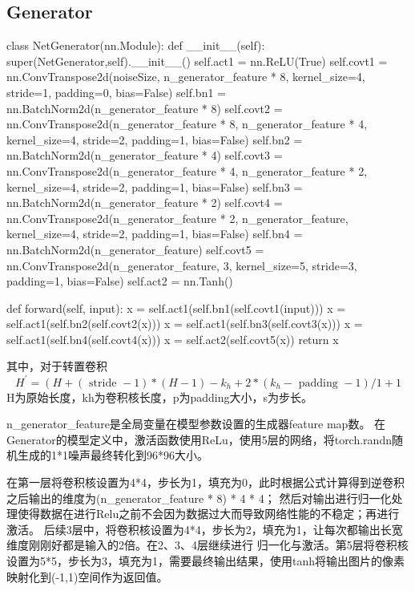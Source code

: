 \documentclass[a4paper,AutoFakeBold,AutoFakeSlant]{ctexart}
\begin{document}
\subsection{Generator}
\begin{python}
class NetGenerator(nn.Module):
  def __init__(self):
      super(NetGenerator,self).__init__()
      self.act1 = nn.ReLU(True)
      self.covt1 = nn.ConvTranspose2d(noiseSize, n_generator_feature * 8, kernel_size=4, stride=1, padding=0, bias=False)
      self.bn1 = nn.BatchNorm2d(n_generator_feature * 8)
      self.covt2 = nn.ConvTranspose2d(n_generator_feature * 8, n_generator_feature * 4, kernel_size=4, stride=2, padding=1, bias=False)
      self.bn2 = nn.BatchNorm2d(n_generator_feature * 4)
      self.covt3 = nn.ConvTranspose2d(n_generator_feature * 4, n_generator_feature * 2, kernel_size=4, stride=2, padding=1, bias=False)
      self.bn3 = nn.BatchNorm2d(n_generator_feature * 2)
      self.covt4 = nn.ConvTranspose2d(n_generator_feature * 2, n_generator_feature, kernel_size=4, stride=2, padding=1, bias=False)
      self.bn4 = nn.BatchNorm2d(n_generator_feature)
      self.covt5 = nn.ConvTranspose2d(n_generator_feature, 3, kernel_size=5, stride=3, padding=1, bias=False)
      self.act2 = nn.Tanh()
      
  def forward(self, input):
      x = self.act1(self.bn1(self.covt1(input)))
      x = self.act1(self.bn2(self.covt2(x)))
      x = self.act1(self.bn3(self.covt3(x)))
      x = self.act1(self.bn4(self.covt4(x)))
      x = self.act2(self.covt5(x))
      return x
\end{python}

其中，对于转置卷积
\begin{equation*}
  H^{\prime}=\left(H+(\text { stride }-1) *(H-1)-k_{h}+2 *\left(k_{h}-\text { padding }-1\right) / 1+1\right.
\end{equation*}
H为原始长度，kh为卷积核长度，p为padding大小，s为步长。

n\_generator\_feature是全局变量在模型参数设置的生成器feature map数。
在Generator的模型定义中，激活函数使用ReLu，使用5层的网络，将torch.randn随机生成的1*1噪声最终转化到96*96大小。

在第一层将卷积核设置为4*4，步长为1，填充为0，此时根据公式计算得到逆卷积之后输出的维度为(n\_generator\_feature * 8) * 4 * 4；
然后对输出进行归一化处理使得数据在进行Relu之前不会因为数据过大而导致网络性能的不稳定；再进行激活。
后续3层中，将卷积核设置为4*4，步长为2，填充为1，让每次都输出长宽维度刚刚好都是输入的2倍。在2、3、4层继续进行
归一化与激活。第5层将卷积核设置为5*5，步长为3，填充为1，需要最终输出结果，使用tanh将输出图片的像素映射化到(-1,1)空间作为返回值。
\end{document}
